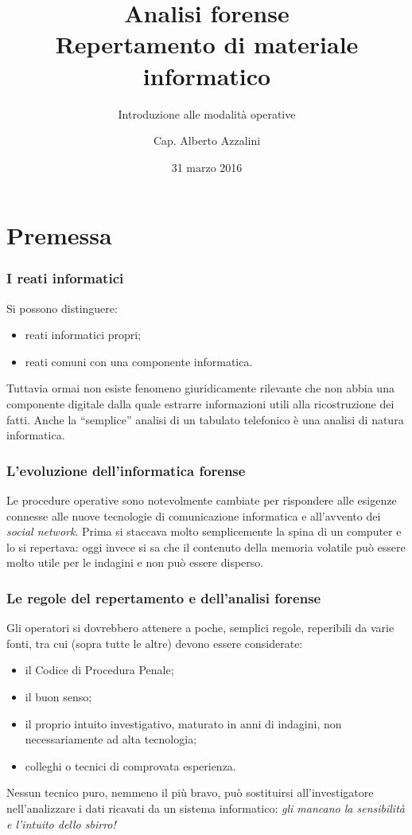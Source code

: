 \documentclass[11pt]{beamer}
\author{Cap. Alberto Azzalini}
\title[Analisi Forense]{Analisi forense\\Repertamento di materiale informatico}
\subtitle{Introduzione alle modalità operative}
\institute{Legione Carabinieri ``Trentino Alto Adige''\\Comando Provinciale di Bolzano\\Compagnia di Vipiteno}
\date{31 marzo 2016}
\begin{document}
	\maketitle
	
	
	\section{Premessa}
	\begin{frame}
		\frametitle{I reati informatici}
		Si possono distinguere:
		\begin{itemize}
			\item reati informatici propri;
			\item reati comuni con una componente informatica.
		\end{itemize}  
				
		Tuttavia ormai non esiste fenomeno giuridicamente rilevante che non abbia una componente digitale dalla quale estrarre informazioni utili alla ricostruzione dei fatti.
		\vfill
		Anche la ``semplice'' analisi di un tabulato telefonico è una analisi di natura informatica.
				
	\end{frame}
	
	\begin{frame}
		\frametitle{L'evoluzione dell'informatica forense}
			Le procedure operative sono notevolmente cambiate per rispondere alle esigenze connesse alle nuove tecnologie di comunicazione informatica e all'avvento dei \textit{social network}.
			\vfill
			Prima si staccava molto semplicemente la spina di un computer e lo si repertava: oggi invece si sa che il contenuto della memoria volatile può essere molto utile per le indagini e non può essere disperso.
	\end{frame}
	
	\begin{frame}
		\frametitle{Le regole del repertamento e dell'analisi forense}
		Gli operatori si dovrebbero attenere a poche, semplici regole, reperibili da varie fonti, tra cui (sopra tutte le altre) devono essere considerate:
		\begin{itemize}
			\item il Codice di Procedura Penale;
			\item il buon senso;
			\item il proprio intuito investigativo, maturato in anni di indagini, non necessariamente ad alta tecnologia;
			\item colleghi o tecnici di comprovata esperienza.
		\end{itemize}
		\vfill
		Nessun tecnico puro, nemmeno il più bravo, può sostituirsi all'investigatore nell'analizzare i dati ricavati da un sistema informatico: \textit{gli mancano la sensibilità e l'intuito dello sbirro!}
		
	\end{frame}
	
\end{document}
